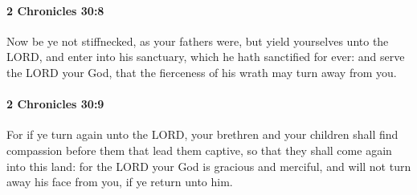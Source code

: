 		\paragraph{2 Chronicles 30:8} %
			\label{2CHRONICLES-30-8}

			Now be ye not stiffnecked, as your fathers were, but yield yourselves unto the LORD, and enter into his sanctuary, which he hath sanctified for ever: and serve the LORD your God, that the fierceness of his wrath may turn away from you.


		\paragraph{2 Chronicles 30:9} %
			\label{2CHRONICLES-30-9}

			For if ye turn again unto the LORD, your brethren and your children shall find compassion before them that lead them captive, so that they shall come again into this land: for the LORD your God is gracious and merciful, and will not turn away his face from you, if ye return unto him.

